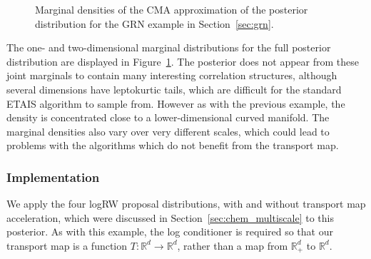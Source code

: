\documentclass[final]{siamltex}
\newcommand{\edit}[1]{{\color{red} #1}}
\begin{document}
\begin{figure}[htb]
\centering
{}%
\caption{Marginal densities of the CMA approximation of the posterior
  distribution for the GRN example in Section~\ref{sec:grn}.}
\label{fig:GRN_posterior}
\end{figure}

The one- and two-dimensional marginal distributions for the full
posterior distribution are displayed in
Figure~\ref{fig:GRN_posterior}. The posterior does not appear from
these joint marginals to contain many
interesting correlation structures, although several dimensions have
leptokurtic tails, which are difficult for the standard ETAIS algorithm
to sample from. However as with the previous example, the density is
concentrated close to a lower-dimensional curved manifold. The marginal densities also vary over very different
scales, which could lead to problems with the algorithms which do not
benefit from the transport map.

\subsubsection{Implementation}

We apply the \edit{four logRW} proposal distributions, with and
without transport map acceleration, which were discussed in
Section~\ref{sec:chem_multiscale} to this posterior. As with this
example, the log conditioner is required so that our transport map is a function $T\colon\mathbb{R}^d\rightarrow\mathbb{R}^d$, rather than a map from $\mathbb{R}_+^d$ to $\mathbb{R}^d$.
\end{document}
